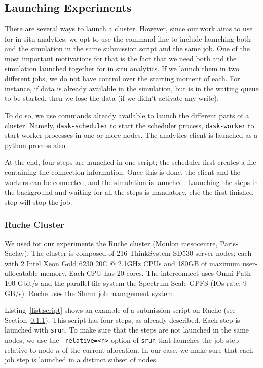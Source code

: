 \subsection{Launching Experiments}\label{sec:launch}
There are several ways to launch a \dask cluster. 
However, since our work aims to use \dask for in situ analytics, we opt to use the command line to include launching both \dask and the simulation in the same submission script and the same job. 
One of the most important motivations for that is the fact that we need both \dask and the simulation launched together for in situ analytics. If we launch them in two different jobs, we do not have control over the starting moment of each. For instance, if data is already available in the simulation, but \dask is in the waiting queue to be started, then we lose the data (if we didn't activate any write). 

To do so, we use commands already available to launch the different parts of a \dask cluster. Namely, \texttt{dask-scheduler} to start the scheduler process, \texttt{dask-worker} to start worker processes in one or more nodes. The analytics client is launched as a python process also.  

At the end, four steps are launched in one script; the scheduler first creates a file containing the connection information. Once this is done, the client and the workers can be connected, and the simulation is launched. Launching the steps in the background and waiting for all the steps is mandatory, else the first finished step will stop the job. 


\subsubsection{Ruche Cluster}\label{sec:ruche}
We used for our experiments the Ruche\cite{ruche} cluster (Moulon mesocentre, Paris-Saclay). The cluster is composed of 216 ThinkSystem SD530 server nodes; each with 2 Intel Xeon Gold 6230 20C @ 2.1GHz CPUs and 180GB of maximum user-allocatable memory. Each CPU has 20 cores. The interconnect uses Omni-Path 100 Gbit/s and the parallel file system the Spectrum Scale GPFS (IOs rate: 9 GB/s). 
Ruche uses the Slurm job management system.  

Listing~\ref{list:script} shows an example of a submission script on Ruche (see Section~\ref{sec:ruche}). This script has four steps, as already described. Each step is launched with \texttt{srun}.
To make sure that the steps are not launched in the same nodes, we use the \texttt{--relative=<n>}\cite{slurm_relative} option of \texttt{srun} that launches the job step relative to node $n$ of the current allocation. In our case, we make sure that each job step is launched in a distinct subset of nodes.  

